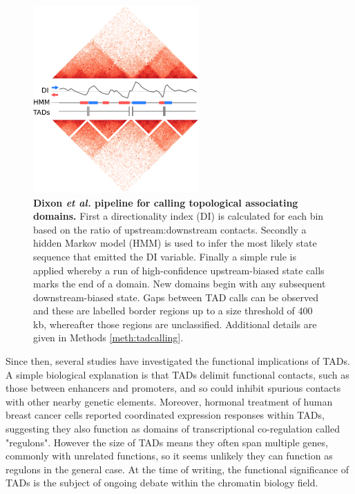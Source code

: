 \documentclass[a4paper,11pt,oneside]{book}
\begin{document}
\begin{figure}
\begin{center}
\includegraphics[width=2.5in]{figs/di_example.png}
\captionsetup{width=\textwidth}
\caption[Dixon \emph{et al.} pipeline for calling topological associating domains.]{ {\bf Dixon \emph{et al.} pipeline for calling topological associating domains.} First a directionality index (DI) is calculated for each bin based on the ratio of upstream:downstream contacts. Secondly a hidden Markov model (HMM) is used to infer the most likely state sequence that emitted the DI variable. Finally a simple rule is applied whereby a run of high-confidence upstream-biased state calls marks the end of a domain. New domains begin with any subsequent downstream-biased state. Gaps between TAD calls can be observed and these are labelled border regions up to a size threshold of 400 kb, whereafter those regions are unclassified.\cite{Dixon2012} Additional details are given in Methods \ref{meth:tadcalling}.
}\label{fig:dicalc}
\end{center}
\end{figure} 

Since then, several studies have investigated the functional implications of TADs. A simple biological explanation is that TADs delimit functional contacts, such as those between enhancers and promoters, and so could inhibit spurious contacts with other nearby genetic elements.\cite{Fraser2015, Sexton2015} Moreover, hormonal treatment of human breast cancer cells reported coordinated expression responses within TADs, suggesting they also function as domains of transcriptional co-regulation called "regulons".\cite{LeDily2014} However the size of TADs means they often span multiple genes, commonly with unrelated functions, so it seems unlikely they can function as regulons in the general case.\cite{Pombo2015} At the time of writing, the functional significance of TADs is the subject of ongoing debate within the chromatin biology field.
\end{document}
